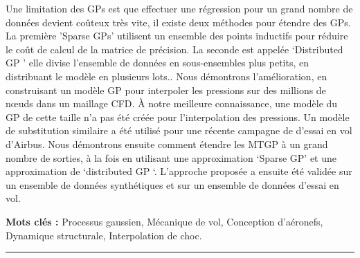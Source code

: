 Une limitation des GPs est que effectuer une régression pour un grand nombre de données devient coûteux très vite, il existe deux méthodes pour étendre des GPs. La première 'Sparse GPs' utilisent un ensemble des points inductifs pour réduire le coût de calcul de la matrice de précision. La seconde est appelée `Distributed GP ' elle divise l'ensemble de données en sous-ensembles plus petits, en distribuant le modèle en plusieurs lots.. Nous démontrons l’amélioration, en construisant un modèle GP pour interpoler les pressions sur des millions de nœuds dans un maillage CFD. À notre meilleure connaissance, une modèle du GP de cette taille n'a pas été créée pour l'interpolation des pressions. Un modèle de substitution similaire a été utilisé pour une récente campagne de d'essai en vol d'Airbus. Nous démontrons ensuite comment étendre les MTGP à un grand nombre de sorties, à la fois en utilisant une approximation `Sparse GP’ et une approximation de `distributed GP ‘. L'approche proposée a ensuite été validée sur un ensemble de données synthétiques et sur un ensemble de données d'essai en vol.

{\large\textbf{Mots clés :}}
    Processus gaussien, Mécanique de vol, Conception d'aéronefs, Dynamique structurale, Interpolation de choc.
\\
\noindent\rule[2pt]{\textwidth}{0.5pt}






